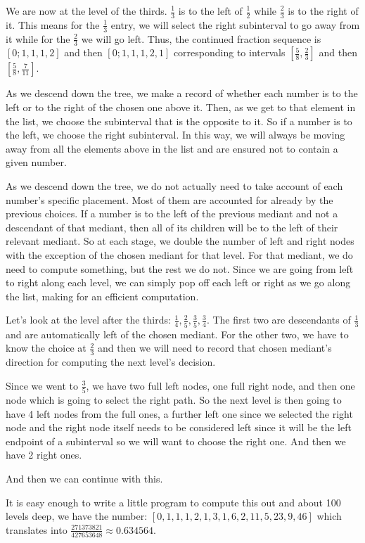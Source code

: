 \documentclass[12pt]{article}
\begin{document}
We are now at the level of the thirds. $\frac{1}{3}$ is to the left of $\frac{1}{2}$ while $\frac{2}{3}$ is to the right of it. This means for the $\frac{1}{3}$ entry, we will select the right subinterval to go away from it while for the $\frac{2}{3}$ we will go left. Thus, the continued fraction sequence is $[0;1, 1, 1, 2]$ and then $[0; 1, 1, 1, 2, 1]$ corresponding to intervals $[\frac{5}{8}, \frac{2}{3}]$ and then $[\frac{5}{8}, \frac{7}{11}]$. 

As we descend down the tree, we make a record of whether each number is to the left or to the right of the chosen one above it. Then, as we get to that element in the list, we choose the subinterval that is the opposite to it. So if a number is to the left, we choose the right subinterval. In this way, we will always be moving away from all the elements above in the list and are ensured not to contain a given number. 

As we descend down the tree, we do not actually need to take account of each number's specific placement. Most of them are accounted for already by the previous choices. If a number is to the left of the previous mediant and not a descendant of that mediant, then all of its children will be to the left of their relevant mediant. So at each stage, we double the number of left and right nodes with the exception of the chosen mediant for that level. For that mediant, we do need to compute something, but the rest we do not. Since we are going from left to right along each level, we can simply pop off each left or right as we go along the list, making for an efficient computation. 

Let's look at the level after the thirds:  $\frac{1}{4}, \frac{2}{5}, \frac{3}{5}, \frac{3}{4}$. The first two are descendants of $\frac{1}{3}$ and are automatically left of the chosen mediant. For the other two, we have to know the choice at $\frac{2}{3}$ and then we will need to record that chosen mediant's direction for computing the next level's decision. 

Since we went to $\frac{3}{5}$, we have two full left nodes, one full right node, and then one node which is going to select the right path. So the next level is then going to have 4 left nodes from the full ones, a further left one since we selected the right node and the right node itself needs to be considered left since it will be the left endpoint of a subinterval so we will want to choose the right one. And then we have 2 right ones. 

And then we can continue with this. 

It is easy enough to write a little program to compute this out and about 100 levels deep, we have the number:  $[
       0,      1,      1,      1,       2,
       1,      3,      1,      6,       2,
      11,      5,     23,      9,      46]$  which translates into $\frac{271373821}{427653648} \approx 0.634564$. 


\medskip

\normalem %
\printbibliography
\end{document}
